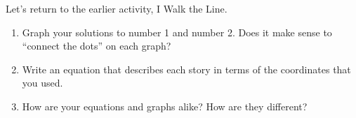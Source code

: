 \documentclass{ximera}
\begin{document}
\begin{problem}
Let's return to the earlier activity, I Walk the Line.
    \begin{enumerate}
        \item Graph your solutions to number 1 and number 2.  Does it make sense to ``connect the dots'' on each graph?
        \item Write an equation that describes each story in terms of the coordinates that you used.
        \item How are your equations and graphs alike? How are they different?
    \end{enumerate}    

\end{problem}









\end{document}
